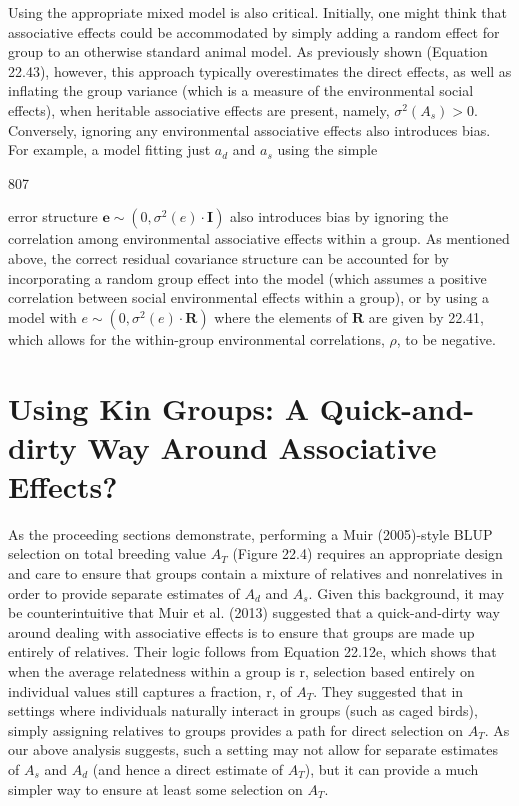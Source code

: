 \documentclass{article}
\begin{document}
Using the appropriate mixed model is also critical. Initially, one might think that associative effects could be accommodated by simply adding a random effect for group to an otherwise standard animal model. As previously shown (Equation 22.43), however, this approach typically overestimates the direct effects, as well as inflating the group variance (which is a measure of the environmental social effects), when heritable associative effects are present, namely,  $ \sigma^2(A_s) > 0 $. Conversely, ignoring any environmental associative effects also introduces bias. For example, a model fitting just  $ a_d $ and  $ a_s $ using the simple

807

error structure  $ \mathbf{e} \sim (0, \sigma^2(e) \cdot \mathbf{I}) $ also introduces bias by ignoring the correlation among environmental associative effects within a group. As mentioned above, the correct residual covariance structure can be accounted for by incorporating a random group effect into the model (which assumes a positive correlation between social environmental effects within a group), or by using a model with  $ e \sim (0, \sigma^2(e) \cdot \mathbf{R}) $ where the elements of  $ \mathbf{R} $ are given by 22.41, which allows for the within-group environmental correlations,  $ \rho $, to be negative.

\section{Using Kin Groups: A Quick-and-dirty Way Around Associative Effects?}
As the proceeding sections demonstrate, performing a Muir (2005)-style BLUP selection on total breeding value  $ A_T $ (Figure 22.4) requires an appropriate design and care to ensure that groups contain a mixture of relatives and nonrelatives in order to provide separate estimates of  $ A_d $ and  $ A_s $. Given this background, it may be counterintuitive that Muir et al. (2013) suggested that a quick-and-dirty way around dealing with associative effects is to ensure that groups are made up entirely of relatives. Their logic follows from Equation 22.12e, which shows that when the average relatedness within a group is r, selection based entirely on individual values still captures a fraction, r, of  $ A_T $. They suggested that in settings where individuals naturally interact in groups (such as caged birds), simply assigning relatives to groups provides a path for direct selection on  $ A_T $. As our above analysis suggests, such a setting may not allow for separate estimates of  $ A_s $ and  $ A_d $ (and hence a direct estimate of  $ A_T $), but it can provide a much simpler way to ensure at least some selection on  $ A_T $.
\end{document}
